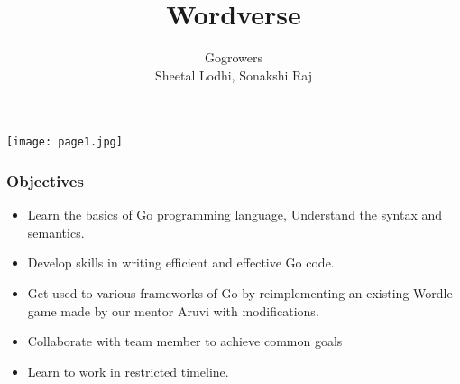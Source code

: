 \documentclass{beamer}
\begin{document}
\begin{frame}
\title{Wordverse}
\author{Gogrowers \\ Sheetal Lodhi, Sonakshi Raj}



  \titlepage
  \texttt{[image: page1.jpg]}
\end{frame}

\begin{frame}
  \frametitle{Objectives}
  \begin{itemize}
    \item Learn the basics of Go programming language, Understand the syntax and semantics.
    \item Develop skills in writing efficient and effective Go code.
    \item Get used to various frameworks of Go by reimplementing an existing Wordle game made by our mentor Aruvi with modifications.
    \item Collaborate with team member to achieve common goals
    \item Learn to work in restricted timeline.
  \end{itemize}
  
\end{frame}
\end{document}
